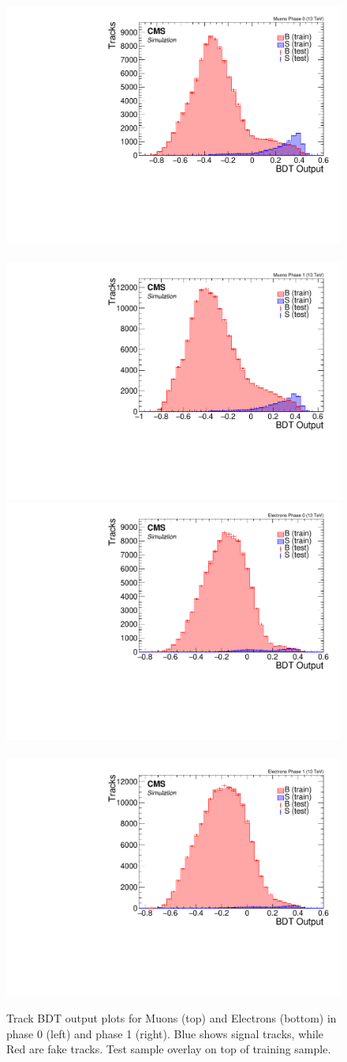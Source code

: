 \begin{figure}[!htb]
\centering
\includegraphics[width=0.48\linewidth]{plots/track_bdt/overtraining_Tracks_Muons_Phase_0.pdf} \,
\includegraphics[width=0.48\linewidth]{plots/track_bdt/overtraining_Tracks_Muons_Phase_1.pdf}  \\
\includegraphics[width=0.48\linewidth]{plots/track_bdt/overtraining_Tracks_Electrons_Phase_0.pdf} \,
\includegraphics[width=0.48\linewidth]{plots/track_bdt/overtraining_Tracks_Electrons_Phase_1.pdf} \\
\caption[Track BDT output plots]{Track BDT output plots for Muons (top) and Electrons (bottom) in phase 0 (left) and phase 1 (right). Blue shows signal tracks, while Red are fake tracks. Test sample overlay on top of training sample.}
\label{fig:track-bdt-output}
\end{figure}


